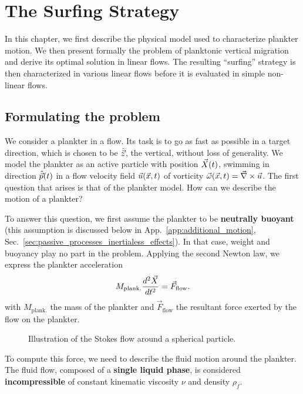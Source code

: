 \chapter{The Surfing Strategy}\label{chap:the_surfing_strategy}

In this chapter, we first describe the physical model used to characterize plankter motion.
We then present formally the problem of planktonic vertical migration and derive its optimal solution in linear flows.
The resulting ``surfing'' strategy is then characterized in various linear flows before it is evaluated in simple non-linear flows.

\section{Formulating the problem}\label{sec:the_surfing_strategy_problem}

We consider a plankter in a flow.
Its task is to go as fast as possible in a target direction, which is chosen to be $\hat{\vec{z}}$, the vertical, without loss of generality.
We model the plankter as an active particle with position $\vec{X} (t)$, swimming in direction $\hat{\vec{p}}(t)$ in a flow velocity field $\vec{u} (\vec{x}, t)$ of vorticity $\vec{\omega} (\vec{x}, t) = \vec{\nabla} \times \vec{u}$.
The first question that arises is that of the plankter model.
How can we describe the motion of a plankter?

To answer this question, we first assume the plankter to be \textbf{neutrally buoyant} (this assumption is discussed below in App.~\ref{app:additional_motion}, Sec.~\ref{sec:passive_processes_inertialess_effects}).
In that case, weight and buoyancy play no part in the problem.
Applying the second Newton law, we express the plankter acceleration
\begin{equation}\label{eq:newton_motion}
	M_{\mathrm{plank.}} \frac{d^2 \vec{X}}{d t^2} = \vec{F}_{\mathrm{flow}}.
\end{equation}
with $M_{\mathrm{plank.}}$ the mass of the plankter and $\vec{F}_{\mathrm{flow}}$ the resultant force exerted by the flow on the plankter.

\begin{wrapfigure}[14]{R}[0.4\width]{0.3\textwidth}
	\vspace{-5pt}
	\centering
	\def\svgwidth{0.25\textwidth}
	
	\captionsetup{width=0.25\textwidth}
  	\caption{
  		Illustration of the Stokes flow around a spherical particle.
  	}
  	\label{fig:stokes_flow}
\end{wrapfigure}
To compute this force, we need to describe the fluid motion around the plankter.
The fluid flow, composed of a \textbf{single liquid phase}, is considered \textbf{incompressible} of constant kinematic viscosity $\nu$ and density $\rho_f$.

